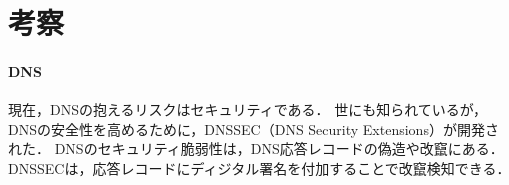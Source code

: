 \section{考察}
\paragraph{DNS}
現在，DNSの抱えるリスクはセキュリティである．
世にも知られているが，DNSの安全性を高めるために，DNSSEC（DNS Security Extensions）が開発された．
DNSのセキュリティ脆弱性は，DNS応答レコードの偽造や改竄にある．
DNSSECは，応答レコードにディジタル署名を付加することで改竄検知できる．